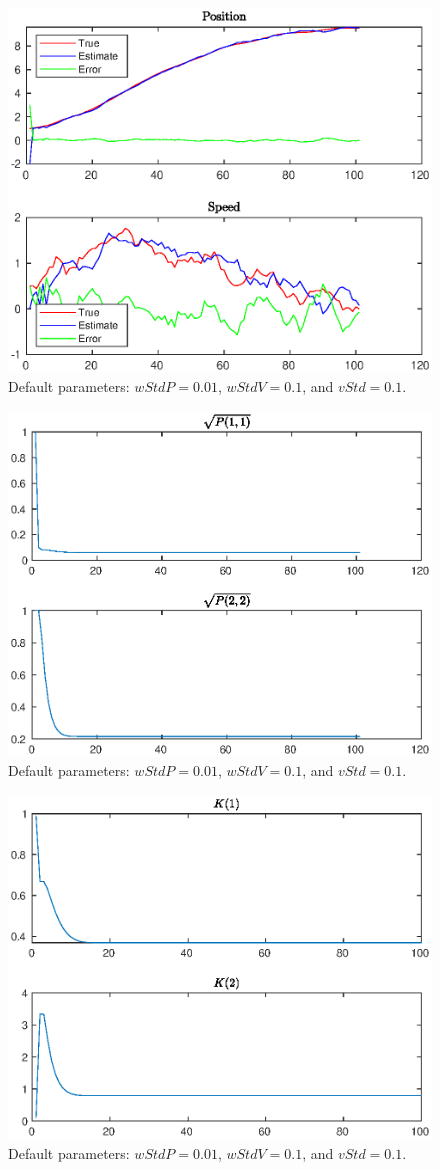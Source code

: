 \documentclass[11pt,a4paper]{article}
\begin{document}
\begin{itemize}
		\newpage
		\begin{figure}[H]
			\centering
			\includegraphics[width=0.57\columnwidth]{Warmup_Figure_1_wP_0_01_wV_0_1_vP_0_1.eps}
			\caption{Default parameters: $wStdP = 0.01$, $wStdV = 0.1$, and $vStd = 0.1$.}
			\label{fig:Warmup_Figure_1_wP_0_01_wV_0_1_vP_0_1}
		\end{figure}
			
		\begin{figure}[H]
			\centering
			\includegraphics[width=0.57\columnwidth]{Warmup_Figure_2_wP_0_01_wV_0_1_vP_0_1.eps}
			\caption{Default parameters: $wStdP = 0.01$, $wStdV = 0.1$, and $vStd = 0.1$.}
			\label{fig:Warmup_Figure_2_wP_0_01_wV_0_1_vP_0_1}
		\end{figure}
		
		\begin{figure}[H]
			\centering
			\includegraphics[width=0.57\columnwidth]{Warmup_Figure_3_wP_0_01_wV_0_1_vP_0_1.eps}
			\caption{Default parameters: $wStdP = 0.01$, $wStdV = 0.1$, and $vStd = 0.1$.}
			\label{fig:Warmup_Figure_3_wP_0_01_wV_0_1_vP_0_1}
		\end{figure}
		

\end{itemize}
\end{document}
